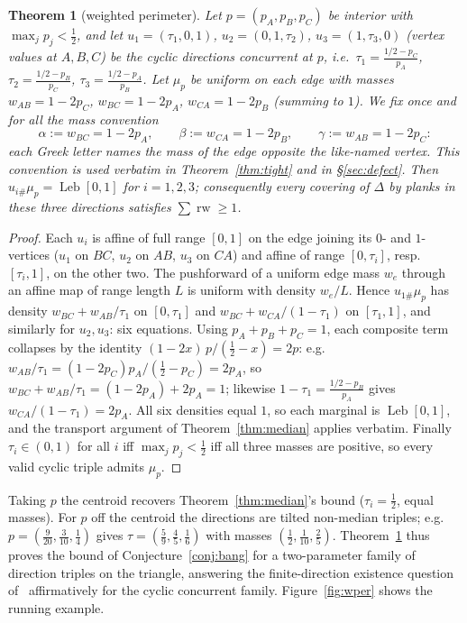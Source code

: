 \documentclass{aims}
\numberwithin{equation}{section}
\theoremstyle{plain}
\newtheorem{theorem}{Theorem}[section]
\theoremstyle{definition}
\theoremstyle{remark}
\newcommand{\rw}{\operatorname{rw}}
\newcommand{\Leb}{\operatorname{Leb}}
\begin{document}
\begin{theorem}[weighted perimeter]\label{thm:wper}
Let $p=(p_A,p_B,p_C)$ be interior with $\max_j p_j<\tfrac12$, and let
$u_1=(\tau_1,0,1)$, $u_2=(0,1,\tau_2)$, $u_3=(1,\tau_3,0)$ (vertex values at
$A,B,C$) be the cyclic directions concurrent at $p$, i.e.\
$\tau_1=\frac{1/2-p_C}{p_A}$, $\tau_2=\frac{1/2-p_B}{p_C}$,
$\tau_3=\frac{1/2-p_A}{p_B}$. Let $\mu_p$ be uniform on each edge with masses
$w_{AB}=1-2p_C$, $w_{BC}=1-2p_A$, $w_{CA}=1-2p_B$ (summing to $1$). We fix
once and for all the \emph{mass convention}
\[
\alpha:=w_{BC}=1-2p_A,\qquad \beta:=w_{CA}=1-2p_B,\qquad
\gamma:=w_{AB}=1-2p_C:
\]
each Greek letter names the mass of the edge \emph{opposite} the like-named
vertex. This convention is used verbatim in Theorem~\ref{thm:tight} and in
\S\ref{sec:defect}. Then
$u_{i\#}\mu_p=\Leb[0,1]$ for $i=1,2,3$; consequently every covering of $\Delta$ by
planks in these three directions satisfies $\sum\rw\ge1$.
\end{theorem}
\begin{proof}
Each $u_i$ is affine of full range $[0,1]$ on the edge joining its $0$- and
$1$-vertices ($u_1$ on $BC$, $u_2$ on $AB$, $u_3$ on $CA$) and affine of range
$[0,\tau_i]$, resp.\ $[\tau_i,1]$, on the other two. The pushforward of a uniform
edge mass $w_e$ through an affine map of range length $L$ is uniform with density
$w_e/L$. Hence $u_{1\#}\mu_p$ has density $w_{BC}+w_{AB}/\tau_1$ on $[0,\tau_1]$ and
$w_{BC}+w_{CA}/(1-\tau_1)$ on $[\tau_1,1]$, and similarly for $u_2,u_3$: six
equations. Using $p_A+p_B+p_C=1$, each composite term collapses by the identity
$(1-2x)\,p/(\tfrac12-x)=2p$: e.g.\
$w_{AB}/\tau_1=(1-2p_C)p_A/(\tfrac12-p_C)=2p_A$, so
$w_{BC}+w_{AB}/\tau_1=(1-2p_A)+2p_A=1$; likewise
$1-\tau_1=\frac{1/2-p_B}{p_A}$ gives $w_{CA}/(1-\tau_1)=2p_A$. All six densities
equal $1$, so each marginal is $\Leb[0,1]$, and the transport argument of
Theorem~\ref{thm:median} applies verbatim. Finally $\tau_i\in(0,1)$ for all $i$ iff
$\max_jp_j<\tfrac12$ iff all three masses are positive, so every valid cyclic triple
admits $\mu_p$.
\end{proof}
Taking $p$ the centroid recovers Theorem~\ref{thm:median}'s bound ($\tau_i=\tfrac12$,
equal masses). For $p$ off the centroid the directions are tilted non-median
triples; e.g.\ $p=(\tfrac9{20},\tfrac3{10},\tfrac14)$ gives
$\tau=(\tfrac59,\tfrac45,\tfrac16)$ with masses $(\tfrac12,\tfrac1{10},\tfrac25)$.
Theorem~\ref{thm:wper} thus proves the bound of Conjecture~\ref{conj:bang} for a
two-parameter family of direction triples on the triangle, answering the
finite-direction existence question of~\cite{Gardner88} affirmatively for the cyclic
concurrent family. Figure~\ref{fig:wper} shows the running example.
\end{document}
